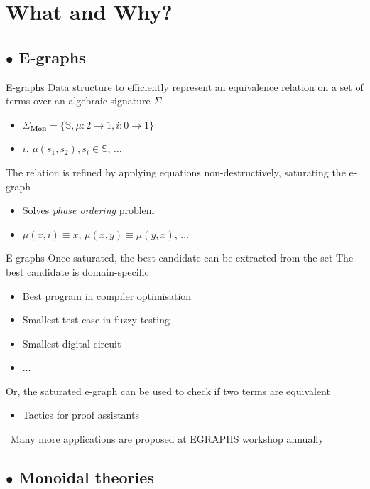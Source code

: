 \documentclass[aspectratio=169]{beamer}
\newcommand{\bsubsection}[1]{\subsection{$\bullet$ #1}}
\begin{document}
\section{What and Why?}
\bsubsection{E-graphs}

\begin{frame}{E-graphs}
    Data structure to \alert{efficiently} represent an equivalence relation on a set of terms over an \alert{algebraic} signature $\Sigma$
    \pause
    \begin{itemize}
        \item $\Sigma_{\mathbf{Mon}} = \{\mathbb{S},\mu : 2 \to 1, i: 0 \to 1\}$
        \item $i$, $\mu(s_1,s_2), s_i \in \mathbb{S}$, $\ldots$
    \end{itemize}
    \pause
    \vfill
    The relation is refined by applying equations \alert{non-destructively}, \alert{saturating} the e-graph
    \begin{itemize}
        \item Solves \emph{phase ordering} problem
        \item $\mu(x,i) \equiv x$, $\mu(x,y) \equiv \mu(y,x)$, $\ldots$
    \end{itemize}
    \vfill
\end{frame}
\begin{frame}{E-graphs}
    \vfill
    Once saturated, the \alert{best} candidate can be extracted from the set
    \vfill
    \pause
    The \alert{best} candidate is domain-specific
    \begin{itemize}
        \item Best program in compiler optimisation
        \item Smallest test-case in fuzzy testing
        \item Smallest digital circuit
        \item $\ldots$
    \end{itemize}
    \vfill
    \pause
    Or, the saturated e-graph can be used to check if two terms are equivalent
    \begin{itemize}
        \item Tactics for proof assistants
    \end{itemize}
    \pause
    \vfill\
    Many more applications are proposed at EGRAPHS workshop annually
\end{frame}

\bsubsection{Monoidal theories}
\end{document}
